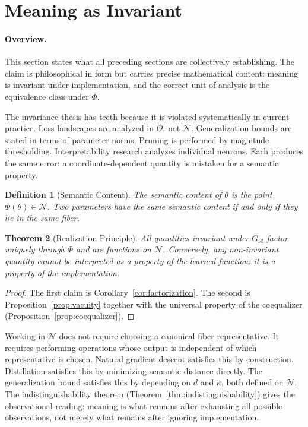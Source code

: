 \documentclass[twocolumn,10pt]{article}
\theoremstyle{thmstyle}
\newtheorem{theorem}{Theorem}[section]
\theoremstyle{defstyle}
\newtheorem{definition}[theorem]{Definition}
\begin{document}
\section{Meaning as Invariant}
\label{sec:meaning}

\paragraph{Overview.}
This section states what all preceding sections are collectively
establishing. The claim is philosophical in form but carries precise
mathematical content: meaning is invariant under implementation, and
the correct unit of analysis is the equivalence class under $\Phi$.

The invariance thesis has teeth because it is violated systematically in
current practice. Loss landscapes are analyzed in $\Theta$, not
$\mathcal{N}$. Generalization bounds are stated in terms of parameter
norms. Pruning is performed by magnitude thresholding. Interpretability
research analyzes individual neurons. Each produces the same error: a
coordinate-dependent quantity is mistaken for a semantic property.

\begin{definition}[Semantic Content]
The \emph{semantic content} of $\theta$ is the point $\Phi(\theta)
\in \mathcal{N}$. Two parameters have the same semantic content if and
only if they lie in the same fiber.
\end{definition}

\begin{theorem}[Realization Principle]
\label{thm:realization-principle}
All quantities invariant under $G_\mathcal{A}$ factor uniquely through
$\Phi$ and are functions on $\mathcal{N}$. Conversely, any non-invariant
quantity cannot be interpreted as a property of the learned function:
it is a property of the implementation.
\end{theorem}

\begin{proof}
The first claim is Corollary~\ref{cor:factorization}. The second is
Proposition~\ref{prop:vacuity} together with the universal property of
the coequalizer (Proposition~\ref{prop:coequalizer}).
\end{proof}

Working in $\mathcal{N}$ does not require choosing a canonical fiber
representative. It requires performing operations whose output is
independent of which representative is chosen. Natural gradient descent
satisfies this by construction. Distillation satisfies this by
minimizing semantic distance directly. The generalization bound satisfies
this by depending on $d$ and $\kappa$, both defined on $\mathcal{N}$.
The indistinguishability theorem (Theorem~\ref{thm:indistinguishability})
gives the observational reading: meaning is what remains after exhausting
all possible observations, not merely what remains after ignoring
implementation.
\end{document}
